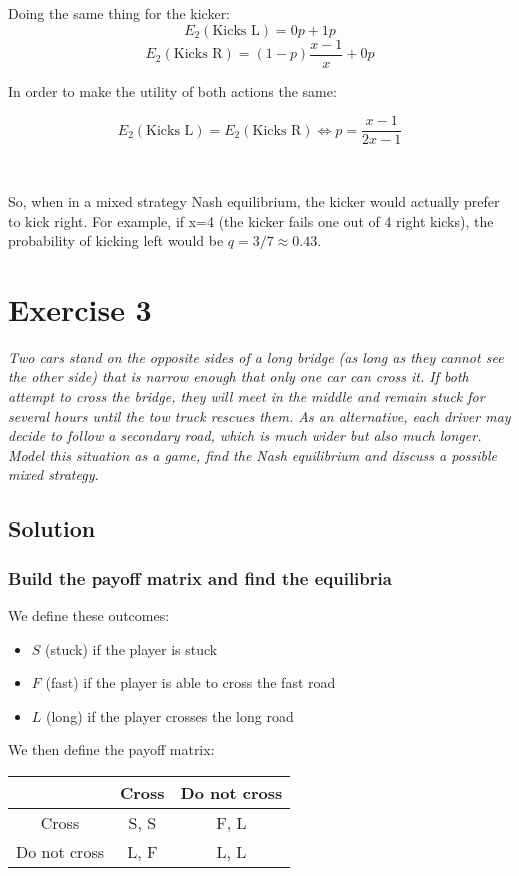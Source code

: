 \documentclass{article}
\begin{document}
Doing the same thing for the kicker:
\[
E_2(\text{Kicks L}) = 0p + 1p
\]
\[
E_2(\text{Kicks R}) = (1-p)\dfrac{x-1}{x} + 0p
\]

In order to make the utility of both actions the same:

\[ E_2(\text{Kicks L}) = E_2(\text{Kicks R}) \iff  p = \dfrac{x-1}{2x-1} \]

\

So, when in a mixed strategy Nash equilibrium, the kicker would actually prefer to kick right. For example, if x=4 (the kicker fails one out of 4 right kicks), the probability of kicking left would be \(q = 3/7 \approx 0.43\).

\section{Exercise 3}
{\itshape
Two cars stand on the opposite sides of a long bridge (as long as they cannot see the other
side) that is narrow enough that only one car can cross it. If both attempt to cross the bridge,
they will meet in the middle and remain stuck for several hours until the tow truck rescues them.
As an alternative, each driver may decide to follow a secondary road, which is much wider but
also much longer.  Model this situation as a game, find the Nash equilibrium and discuss a
possible mixed strategy.
}

\subsection{Solution}

\subsubsection*{Build the payoff matrix and find the equilibria}

We define these outcomes:

\begin{itemize}
    \item \(S\) (stuck) if the player is stuck
    \item \(F\) (fast) if the player is able to cross the fast road
    \item \(L\) (long) if the player crosses the long road
\end{itemize}

We then define the payoff matrix:

\begin{center}
    \begin{tabular}{|c|c|c|}
        \hline
                        & Cross & Do not cross \\\hline
        Cross           &  S, S & F, L \\\hline
        Do not cross    &  L, F & L, L \\\hline
    \end{tabular}
\end{center}
\end{document}
